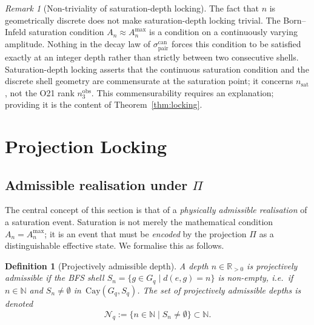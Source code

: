 \documentclass[12pt,a4paper]{article}
\newtheorem{definition}[theorem]{Definition}
\theoremstyle{remark}
\newtheorem{remark}[theorem]{Remark}
\newcommand{\Amax}{A_n^{\max}}
\newcommand{\sigpair}{\sigma^{\mathrm{can}}_{\mathrm{pair}}}
\newcommand{\nsat}{n_{\mathrm{sat}}}
\newcommand{\nobs}{n^{\mathrm{obs}}_3}
\newcommand{\Cay}{\mathrm{Cay}(G_q, S_q)}
\begin{document}
    \begin{remark}[Non-triviality of saturation-depth locking]
      \label{rem:non_trivial}
      The fact that $n$ is geometrically discrete does not make saturation-depth locking trivial.
      The Born--Infeld saturation condition $A_n \approx \Amax$ is a condition on a continuously
      varying amplitude.
      Nothing in the decay law of $\sigpair$ forces this condition to be satisfied exactly at an
      integer depth rather than strictly between two consecutive shells.
      Saturation-depth locking asserts that the continuous saturation condition and the discrete shell
      geometry are commensurate at the saturation point; it concerns $\nsat$, not the O21 rank $\nobs$.
      This commensurability requires an explanation; providing it is the content of
      Theorem~\ref{thm:locking}.
    \end{remark}

  \section{Projection Locking}
  \label{sec:locking}

  \subsection{Admissible realisation under $\Pi$}
    \label{subsec:admissible_realisation}

    The central concept of this section is that of a \emph{physically admissible realisation}
    of a saturation event.
    Saturation is not merely the mathematical condition $A_n = \Amax$; it is an event that must
    be \emph{encoded} by the projection $\Pi$ as a distinguishable effective state.
    We formalise this as follows.

    \begin{definition}[Projectively admissible depth]
      \label{def:admissible_depth}
      A depth $n \in \mathbb{R}_{>0}$ is \emph{projectively admissible} if the BFS shell
      $S_n = \{g \in G_q \mid d(e, g) = n\}$ is non-empty, i.e.\ if $n \in \mathbb{N}$ and
      $S_n \neq \emptyset$ in~$\Cay$.
      The set of projectively admissible depths is denoted
      \begin{equation}
        \label{eq:admissible_depths}
        \mathcal{N}_q := \{n \in \mathbb{N} \mid S_n \neq \emptyset\} \subset \mathbb{N}.
      \end{equation}
    \end{definition}
\end{document}

